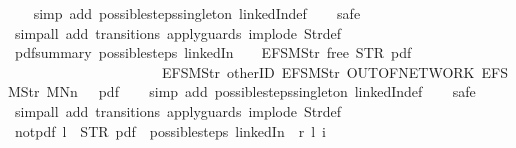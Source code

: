 \begin{isabellebody}
%
\isadelimproof
\ \ %
\endisadelimproof
%
\isatagproof
{}\isamarkupfalse%
\ {\isacharparenleft}simp\ add{\isacharcolon}\ possible{\isacharunderscore}steps{\isacharunderscore}singleton\ linkedIn{\isacharunderscore}def{\isacharparenright}\isanewline
\ \ \isamarkupfalse%
\ safe\isanewline
\ \ \isamarkupfalse%
\ {\isacharparenleft}simp{\isacharunderscore}all\ add{\isacharcolon}\ transitions\ apply{\isacharunderscore}guards\ implode\ Str{\isacharunderscore}def{\isacharparenright}%
\endisatagproof
{\isafoldproof}%
%
\isadelimproof
\isanewline
%
\endisadelimproof
\isanewline
{}\isamarkupfalse%
\ pdf{\isacharunderscore}summary{\isacharcolon}\ {\isachardoublequoteopen}possible{\isacharunderscore}steps\ linkedIn\ {}\ {\isacharless}{}\ {\isacharcolon}{\isacharequal}\ EFSM{\isachardot}Str\ {\isacharprime}{\isacharprime}free{\isacharprime}{\isacharprime}{\isachargreater}\ STR\ {\isacharprime}{\isacharprime}pdf{\isacharprime}{\isacharprime}\isanewline
\ \ \ \ \ \ \ \ \ \ \ \ \ \ \ \ \ \ \ \ \ \ {\isacharbrackleft}EFSM{\isachardot}Str\ {\isacharprime}{\isacharprime}otherID{\isacharprime}{\isacharprime}{\isacharcomma}\ EFSM{\isachardot}Str\ {\isacharprime}{\isacharprime}OUT{\isacharunderscore}OF{\isacharunderscore}NETWORK{\isacharprime}{\isacharprime}{\isacharcomma}\ EFSM{\isachardot}Str\ {\isacharprime}{\isacharprime}MNn{}{\isacharprime}{\isacharprime}{\isacharbrackright}\ {\isacharequal}\ {\isacharbraceleft}{\isacharbar}{\isacharparenleft}{}{\isacharcomma}\ pdf{}{\isacharparenright}{\isacharbar}{\isacharbraceright}{\isachardoublequoteclose}\isanewline
%
\isadelimproof
\ \ %
\endisadelimproof
%
\isatagproof
{}\isamarkupfalse%
\ {\isacharparenleft}simp\ add{\isacharcolon}\ possible{\isacharunderscore}steps{\isacharunderscore}singleton\ linkedIn{\isacharunderscore}def{\isacharparenright}\isanewline
\ \ \isamarkupfalse%
\ safe\isanewline
\ \ \isamarkupfalse%
\ {\isacharparenleft}simp{\isacharunderscore}all\ add{\isacharcolon}\ transitions\ apply{\isacharunderscore}guards\ implode\ Str{\isacharunderscore}def{\isacharparenright}%
\endisatagproof
{\isafoldproof}%
%
\isadelimproof
\isanewline
%
\endisadelimproof
\isanewline
{}\isamarkupfalse%
\ not{\isacharunderscore}pdf{\isacharunderscore}{}{\isacharcolon}\ {\isachardoublequoteopen}l\ {\isasymnoteq}\ STR\ {\isacharprime}{\isacharprime}pdf{\isacharprime}{\isacharprime}\ {\isasymLongrightarrow}\ possible{\isacharunderscore}steps\ linkedIn\ {}\ r\ l\ i\ {\isacharequal}\ {\isacharbraceleft}{\isacharbar}{\isacharbar}{\isacharbraceright}{\isachardoublequoteclose}\isanewline

\end{isabellebody}
